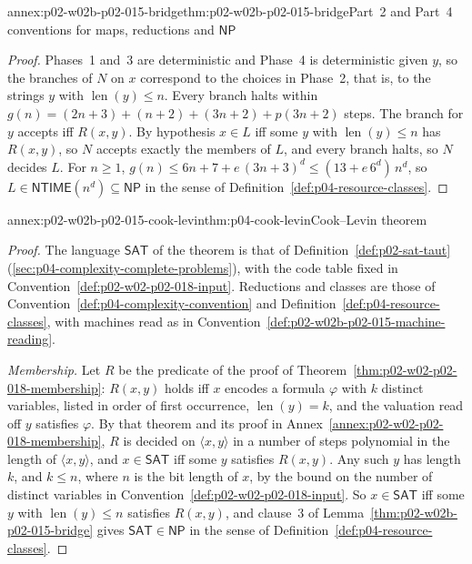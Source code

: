 \begin{annexitem}{annex:p02-w02b-p02-015-bridge}{thm:p02-w02b-p02-015-bridge}{Part~2 and Part~4 conventions for maps, reductions and \(\mathsf{NP}\)}
\begin{proof}
Phases~1 and~3 are deterministic and Phase~4 is deterministic given \(y\), so
the branches of \(N\) on \(x\) correspond to the choices in Phase~2, that is,
to the strings \(y\) with \(\operatorname{len}(y)\leq n\).  Every branch
halts within \(g(n)=(2n+3)+(n+2)+(3n+2)+p(3n+2)\) steps.  The branch for
\(y\) accepts iff \(R(x,y)\).  By hypothesis \(x\in L\) iff some \(y\) with
\(\operatorname{len}(y)\leq n\) has \(R(x,y)\), so \(N\) accepts exactly the
members of \(L\), and every branch halts, so \(N\) decides \(L\).  For
\(n\geq1\), \(g(n)\leq 6n+7+e\,(3n+3)^d\leq(13+e\,6^d)\,n^d\), so \(L\in
\mathsf{NTIME}(n^d)\subseteq\mathsf{NP}\) in the sense of
Definition~\ref{def:p04-resource-classes}.
\end{proof}
\end{annexitem}

\begin{annexitem}{annex:p02-w02b-p02-015-cook-levin}{thm:p04-cook-levin}{Cook--Levin theorem}
\begin{proof}
The language \(\mathsf{SAT}\) of the theorem is that of
Definition~\ref{def:p02-sat-taut} (\cref{sec:p04-complexity-complete-problems}),
with the code table fixed in Convention~\ref{def:p02-w02-p02-018-input}.
Reductions and classes are those of
Convention~\ref{def:p04-complexity-convention} and
Definition~\ref{def:p04-resource-classes}, with machines read as in
Convention~\ref{def:p02-w02b-p02-015-machine-reading}.

\emph{Membership.}  Let \(R\) be the predicate of the proof of
Theorem~\ref{thm:p02-w02-p02-018-membership}: \(R(x,y)\) holds iff \(x\)
encodes a formula \(\varphi\) with \(k\) distinct variables, listed in order
of first occurrence, \(\operatorname{len}(y)=k\), and the valuation read off
\(y\) satisfies \(\varphi\).  By that theorem and its proof in
Annex~\ref{annex:p02-w02-p02-018-membership}, \(R\) is decided on
\(\langle x,y\rangle\) in a number of steps polynomial in the length of
\(\langle x,y\rangle\), and \(x\in\mathsf{SAT}\) iff some \(y\) satisfies
\(R(x,y)\).  Any such \(y\) has length \(k\), and \(k\leq n\), where \(n\) is the
bit length of \(x\), by the bound on the number of distinct variables in
Convention~\ref{def:p02-w02-p02-018-input}.  So \(x\in\mathsf{SAT}\) iff some \(y\) with
\(\operatorname{len}(y)\leq n\) satisfies \(R(x,y)\), and clause~3 of
Lemma~\ref{thm:p02-w02b-p02-015-bridge} gives
\(\mathsf{SAT}\in\mathsf{NP}\) in the sense of
Definition~\ref{def:p04-resource-classes}.


\end{proof}
\end{annexitem}
